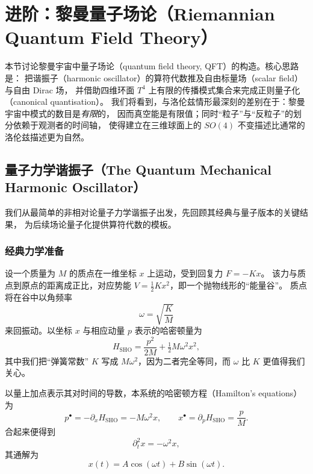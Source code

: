 \providecommand{\bchi}{\boldsymbol{\chi}}
\providecommand{\bdelta}{\boldsymbol{\delta}}
\providecommand{\by}{\mathbf{y}}
\providecommand{\Chi}{\mathcal{X}}

\section{进阶：黎曼量子场论（Riemannian Quantum Field Theory）}

本节讨论黎曼宇宙中量子场论（quantum field theory, QFT）的构造。核心思路是：
把谐振子（harmonic oscillator）的算符代数推及自由标量场（scalar field）与自由 Dirac 场，
并借助四维环面 $T^{4}$ 上有限的传播模式集合来完成正则量子化（canonical quantisation）。
我们将看到，与洛伦兹情形最深刻的差别在于：黎曼宇宙中模式的数目是\emph{有限}的，
因而真空能是有限值；同时“粒子”与“反粒子”的划分依赖于观测者的时间轴，
使得建立在三维球面上的 $SO(4)$ 不变描述比通常的洛伦兹描述更为自然。

\subsection{量子力学谐振子（The Quantum Mechanical Harmonic Oscillator）}

我们从最简单的非相对论量子力学谐振子出发，先回顾其经典与量子版本的关键结果，
为后续场论量子化提供算符代数的模板。

\subsubsection*{经典力学准备}

设一个质量为 $M$ 的质点在一维坐标 $x$ 上运动，受到回复力 $F=-Kx$。
该力与质点到原点的距离成正比，对应势能 $V=\tfrac12 Kx^{2}$，即一个抛物线形的“能量谷”。
质点将在谷中以角频率
\begin{equation*}
\omega=\sqrt{\frac{K}{M}}
\end{equation*}
来回振动。以坐标 $x$ 与相应动量 $p$ 表示的哈密顿量为
\begin{equation}
H_{\text{SHO}}=\frac{p^{2}}{2M}+\tfrac12 M\omega^{2}x^{2},
\tag{Hamiltonian}
\end{equation}
其中我们把“弹簧常数” $K$ 写成 $M\omega^{2}$，因为二者完全等同，而 $\omega$ 比 $K$ 更值得我们关心。

以量上加点表示其对时间的导数，本系统的哈密顿方程（Hamilton's equations）为
\begin{equation*}
p^{\bullet}=-\partial_{x}H_{\text{SHO}}=-M\omega^{2}x,
\qquad
x^{\bullet}=\partial_{p}H_{\text{SHO}}=\frac{p}{M}.
\end{equation*}
合起来便得到
\begin{equation*}
\partial_{t}^{2}x=-\omega^{2}x,
\end{equation*}
其通解为
\begin{equation*}
x(t)=A\cos(\omega t)+B\sin(\omega t).
\end{equation*}

